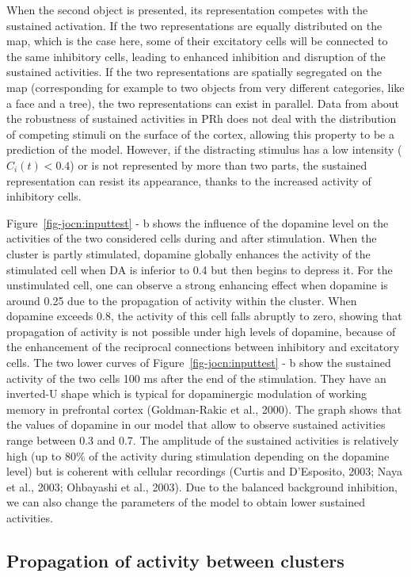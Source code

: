 \documentclass[
  11pt,
  a4paper,
]{scrbook}
\begin{document}
When the second object is presented, its representation competes with
the sustained activation. If the two representations are equally
distributed on the map, which is the case here, some of their excitatory
cells will be connected to the same inhibitory cells, leading to
enhanced inhibition and disruption of the sustained activities. If the
two representations are spatially segregated on the map (corresponding
for example to two objects from very different categories, like a face
and a tree), the two representations can exist in parallel. Data from
about the robustness of sustained activities in PRh does not deal with
the distribution of competing stimuli on the surface of the cortex,
allowing this property to be a prediction of the model. However, if the
distracting stimulus has a low intensity (\(C_i(t) < 0.4\)) or is not
represented by more than two parts, the sustained representation can
resist its appearance, thanks to the increased activity of inhibitory
cells.

Figure~\ref{fig-jocn:inputtest} - b shows the influence of the dopamine
level on the activities of the two considered cells during and after
stimulation. When the cluster is partly stimulated, dopamine globally
enhances the activity of the stimulated cell when DA is inferior to 0.4
but then begins to depress it. For the unstimulated cell, one can
observe a strong enhancing effect when dopamine is around 0.25 due to
the propagation of activity within the cluster. When dopamine exceeds
0.8, the activity of this cell falls abruptly to zero, showing that
propagation of activity is not possible under high levels of dopamine,
because of the enhancement of the reciprocal connections between
inhibitory and excitatory cells. The two lower curves of
Figure~\ref{fig-jocn:inputtest} - b show the sustained activity of the
two cells 100 ms after the end of the stimulation. They have an
inverted-U shape which is typical for dopaminergic modulation of working
memory in prefrontal cortex (Goldman-Rakic et al., 2000). The graph
shows that the values of dopamine in our model that allow to observe
sustained activities range between 0.3 and 0.7. The amplitude of the
sustained activities is relatively high (up to 80\% of the activity
during stimulation depending on the dopamine level) but is coherent with
cellular recordings (Curtis and D'Esposito, 2003; Naya et al., 2003;
Ohbayashi et al., 2003). Due to the balanced background inhibition, we
can also change the parameters of the model to obtain lower sustained
activities.

\subsection{Propagation of activity between
clusters}\label{propagation-of-activity-between-clusters}
\end{document}
